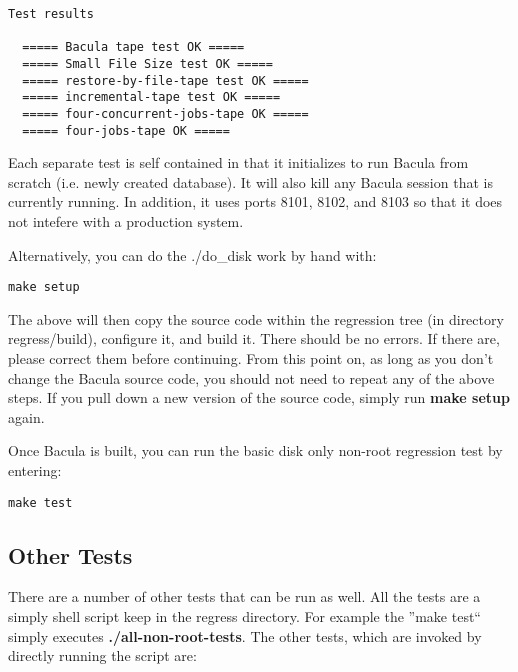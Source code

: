 \footnotesize
\begin{verbatim}
Test results
  
  ===== Bacula tape test OK =====
  ===== Small File Size test OK =====
  ===== restore-by-file-tape test OK =====
  ===== incremental-tape test OK =====
  ===== four-concurrent-jobs-tape OK =====
  ===== four-jobs-tape OK =====
\end{verbatim}
\normalsize

Each separate test is self contained in that it initializes to run Bacula from
scratch (i.e. newly created database). It will also kill any Bacula session
that is currently running. In addition, it uses ports 8101, 8102, and 8103 so
that it does not intefere with a production system. 

Alternatively, you can do the ./do\_disk work by hand with:

\footnotesize
\begin{verbatim}
make setup
\end{verbatim}
\normalsize

The above will then copy the source code within
the regression tree (in directory regress/build), configure it, and build it.
There should be no errors. If there are, please correct them before
continuing. From this point on, as long as you don't change the Bacula
source code, you should not need to repeat any of the above steps.  If
you pull down a new version of the source code, simply run {\bf make setup}
again.


Once Bacula is built, you can run the basic disk only non-root regression test
by entering: 

\footnotesize
\begin{verbatim}
make test
\end{verbatim}
\normalsize


\subsection{Other Tests}

There are a number of other tests that can be run as well. All the tests are a
simply shell script keep in the regress directory. For example the ''make
test`` simply executes {\bf ./all-non-root-tests}. The other tests, which
are invoked by directly running the script are:

